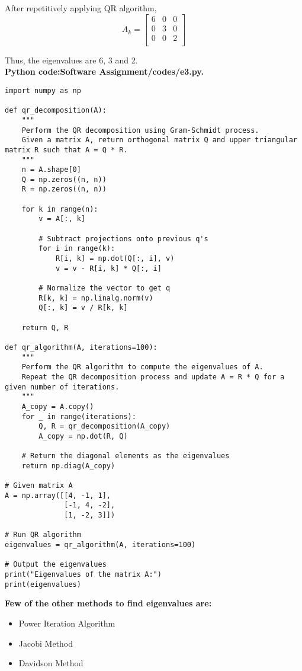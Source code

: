 \documentclass[journal]{IEEEtran}
\begin{document}
After repetitively applying QR algorithm,\\
\[
	A_k=\begin{bmatrix}
		6 & 0 & 0\\
		0 & 3 & 0\\
		0 & 0 & 2\\
	\end{bmatrix}
\]

Thus, the eigenvalues are 6, 3 and 2.\\
\textbf{Python code:Software Assignment/codes/e3.py.}\\
\begin{lstlisting}
import numpy as np

def qr_decomposition(A):
    """
    Perform the QR decomposition using Gram-Schmidt process.
    Given a matrix A, return orthogonal matrix Q and upper triangular matrix R such that A = Q * R.
    """
    n = A.shape[0]
    Q = np.zeros((n, n))
    R = np.zeros((n, n))
    
    for k in range(n):
        v = A[:, k]
        
        # Subtract projections onto previous q's
        for i in range(k):
            R[i, k] = np.dot(Q[:, i], v)
            v = v - R[i, k] * Q[:, i]
        
        # Normalize the vector to get q
        R[k, k] = np.linalg.norm(v)
        Q[:, k] = v / R[k, k]
    
    return Q, R

def qr_algorithm(A, iterations=100):
    """
    Perform the QR algorithm to compute the eigenvalues of A.
    Repeat the QR decomposition process and update A = R * Q for a given number of iterations.
    """
    A_copy = A.copy()
    for _ in range(iterations):
        Q, R = qr_decomposition(A_copy)
        A_copy = np.dot(R, Q)
    
    # Return the diagonal elements as the eigenvalues
    return np.diag(A_copy)

# Given matrix A
A = np.array([[4, -1, 1],
              [-1, 4, -2],
              [1, -2, 3]])

# Run QR algorithm
eigenvalues = qr_algorithm(A, iterations=100)

# Output the eigenvalues
print("Eigenvalues of the matrix A:")
print(eigenvalues)
\end{lstlisting}

\textbf{Few of the other methods to find eigenvalues are:}
\begin{itemize}
	\item Power Iteration Algorithm
	\item Jacobi Method
	\item Davidson Method\\
\end{itemize}
\end{document}
